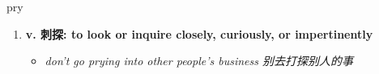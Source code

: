 
\begin{frame}
{\huge pry}
\begin{center}
\begin{enumerate}\Large
  \item \textbf{v. 刺探: to look or inquire closely, curiously, or impertinently}
  \begin{itemize}
    \item \em{\Large{don't go prying into other people's business 别去打探别人的事}}
  \end{itemize}
\end{enumerate}
\end{center}
\end{frame}
